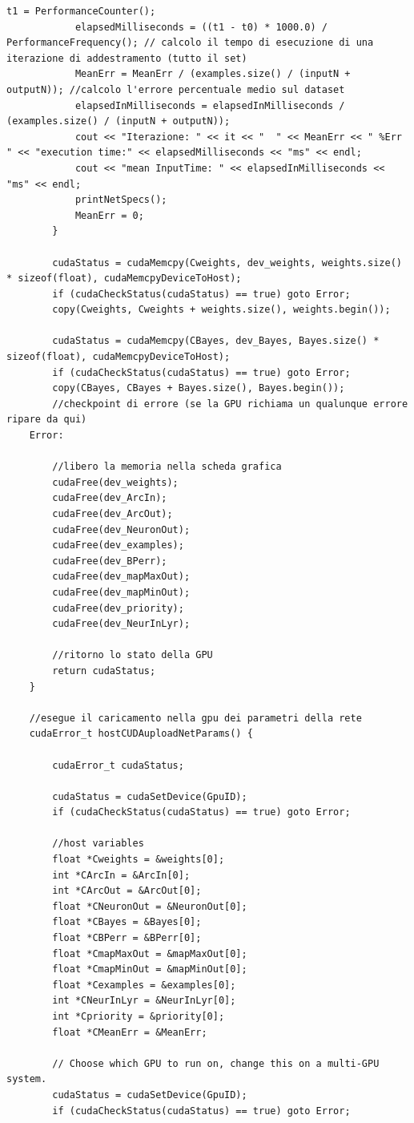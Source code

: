 \documentclass[10pt,a4paper]{article}
\begin{document}
\begin{lstlisting}[style=mycuda, caption= classe di interfaccia alla GPU, captionpos=b]
			t1 = PerformanceCounter();
			elapsedMilliseconds = ((t1 - t0) * 1000.0) / PerformanceFrequency(); // calcolo il tempo di esecuzione di una iterazione di addestramento (tutto il set)
			MeanErr = MeanErr / (examples.size() / (inputN + outputN)); //calcolo l'errore percentuale medio sul dataset
			elapsedInMilliseconds = elapsedInMilliseconds / (examples.size() / (inputN + outputN));
			cout << "Iterazione: " << it << "  " << MeanErr << " %Err  " << "execution time:" << elapsedMilliseconds << "ms" << endl;
			cout << "mean InputTime: " << elapsedInMilliseconds << "ms" << endl;
			printNetSpecs();
			MeanErr = 0;
		}

		cudaStatus = cudaMemcpy(Cweights, dev_weights, weights.size() * sizeof(float), cudaMemcpyDeviceToHost);
		if (cudaCheckStatus(cudaStatus) == true) goto Error;
		copy(Cweights, Cweights + weights.size(), weights.begin());

		cudaStatus = cudaMemcpy(CBayes, dev_Bayes, Bayes.size() * sizeof(float), cudaMemcpyDeviceToHost);
		if (cudaCheckStatus(cudaStatus) == true) goto Error;
		copy(CBayes, CBayes + Bayes.size(), Bayes.begin());
		//checkpoint di errore (se la GPU richiama un qualunque errore ripare da qui)
	Error:

		//libero la memoria nella scheda grafica
		cudaFree(dev_weights);
		cudaFree(dev_ArcIn);
		cudaFree(dev_ArcOut);
		cudaFree(dev_NeuronOut);
		cudaFree(dev_examples);
		cudaFree(dev_BPerr);
		cudaFree(dev_mapMaxOut);
		cudaFree(dev_mapMinOut);
		cudaFree(dev_priority);
		cudaFree(dev_NeurInLyr);

		//ritorno lo stato della GPU
		return cudaStatus;
	}

	//esegue il caricamento nella gpu dei parametri della rete
	cudaError_t hostCUDAuploadNetParams() {

		cudaError_t cudaStatus;

		cudaStatus = cudaSetDevice(GpuID);
		if (cudaCheckStatus(cudaStatus) == true) goto Error;

		//host variables
		float *Cweights = &weights[0];
		int *CArcIn = &ArcIn[0];
		int *CArcOut = &ArcOut[0];
		float *CNeuronOut = &NeuronOut[0];
		float *CBayes = &Bayes[0];
		float *CBPerr = &BPerr[0];
		float *CmapMaxOut = &mapMaxOut[0];
		float *CmapMinOut = &mapMinOut[0];
		float *Cexamples = &examples[0];
		int *CNeurInLyr = &NeurInLyr[0];
		int *Cpriority = &priority[0];
		float *CMeanErr = &MeanErr;

		// Choose which GPU to run on, change this on a multi-GPU system.
		cudaStatus = cudaSetDevice(GpuID);
		if (cudaCheckStatus(cudaStatus) == true) goto Error;


\end{lstlisting}
\end{document}
